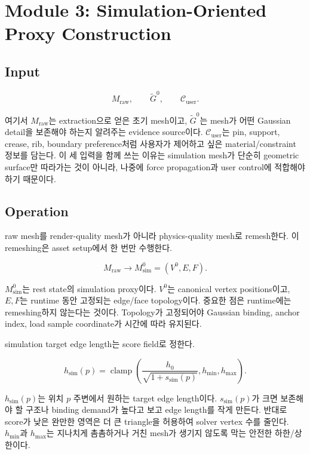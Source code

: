 \documentclass[11pt,a4paper]{article}
\newcommand{\clamp}{\operatorname{clamp}}
\begin{document}
\section{Module 3: Simulation-Oriented Proxy Construction}

\subsection*{Input}

\begin{equation}
M_{\mathrm{raw}},\qquad \widetilde{G}^0,\qquad \mathcal{C}_{\mathrm{user}}.
\end{equation}

여기서 $M_{\mathrm{raw}}$는 extraction으로 얻은 초기 mesh이고, $\widetilde{G}^0$는 mesh가 어떤 Gaussian detail을 보존해야 하는지 알려주는 evidence source이다.
$\mathcal{C}_{\mathrm{user}}$는 pin, support, crease, rib, boundary preference처럼 사용자가 제어하고 싶은 material/constraint 정보를 담는다.
이 세 입력을 함께 쓰는 이유는 simulation mesh가 단순히 geometric surface만 따라가는 것이 아니라, 나중에 force propagation과 user control에 적합해야 하기 때문이다.

\subsection*{Operation}

raw mesh를 render-quality mesh가 아니라 physics-quality mesh로 remesh한다. 이 remeshing은 asset setup에서 한 번만 수행한다.

\begin{equation}
M_{\mathrm{raw}}\rightarrow M_{\mathrm{sim}}^0=(V^0,E,F).
\end{equation}

$M_{\mathrm{sim}}^0$는 rest state의 simulation proxy이다.
$V^0$는 canonical vertex positions이고, $E,F$는 runtime 동안 고정되는 edge/face topology이다.
중요한 점은 runtime에는 remeshing하지 않는다는 것이다.
Topology가 고정되어야 Gaussian binding, anchor index, load sample coordinate가 시간에 따라 유지된다.

simulation target edge length는 score field로 정한다.

\begin{equation}
h_{\mathrm{sim}}(p)=\clamp\left(\frac{h_0}{\sqrt{1+s_{\mathrm{sim}}(p)}},h_{\min},h_{\max}\right).
\end{equation}

$h_{\mathrm{sim}}(p)$는 위치 $p$ 주변에서 원하는 target edge length이다.
$s_{\mathrm{sim}}(p)$가 크면 보존해야 할 구조나 binding demand가 높다고 보고 edge length를 작게 만든다.
반대로 score가 낮은 완만한 영역은 더 큰 triangle을 허용하여 solver vertex 수를 줄인다.
$h_{\min}$과 $h_{\max}$는 지나치게 촘촘하거나 거친 mesh가 생기지 않도록 막는 안전한 하한/상한이다.
\end{document}
